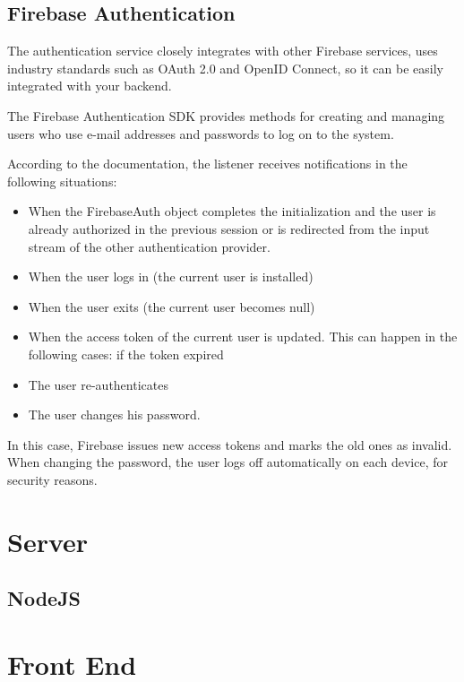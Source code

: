 \subsection{Firebase Authentication}
The authentication service closely integrates with other Firebase services, uses industry standards such as OAuth 2.0 and OpenID Connect, so it can be easily integrated with your backend.\par
The Firebase Authentication SDK provides methods for creating and managing users who use e-mail addresses and passwords to log on to the system.\par
According to the documentation, the listener receives notifications in the following situations:
\begin{itemize}
\item When the FirebaseAuth object completes the initialization and the user is already authorized in the previous session or is redirected from the input stream of the other authentication provider.
\item When the user logs in (the current user is installed)
\item When the user exits (the current user becomes null)
\item When the access token of the current user is updated. This can happen in the following cases:
if the token expired
\item The user re-authenticates
\item The user changes his password.
\end{itemize}
In this case, Firebase issues new access tokens and marks the old ones as invalid. When changing the password, the user logs off automatically on each device, for security reasons. \cite{Firebase}

\section{Server}

\subsection{NodeJS}

\section{Front End}

